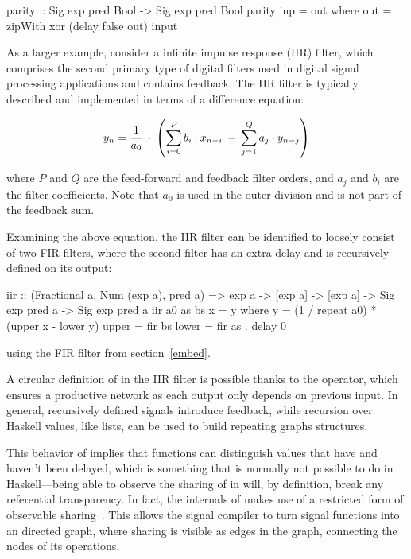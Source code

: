 \documentclass[../paper.tex]{subfiles}
\begin{document}
\begin{code}
parity :: Sig exp pred Bool -> Sig exp pred Bool
parity inp = out where out = zipWith xor (delay false out) input
\end{code}

As a larger example, consider a infinite impulse response (IIR) filter, which comprises the second primary type of digital filters used in digital signal processing applications and contains feedback. The IIR filter is typically described and implemented in terms of a difference equation:

\begin{equation}
y_{n} = {1 \over a_{0}} \: \cdot \: \left( \sum_{i=0}^{P} b_{i} \cdot x_{n-i} \: - \: \sum_{j=1}^{Q} a_{j} \cdot y_{n-j} \right)
\end{equation}
\vspace{1mm}

\noindent where $P$ and $Q$ are the feed-forward and feedback filter orders, and $a_{j}$ and $b_{i}$ are the filter coefficients. Note that $a_{0}$ is used in the outer division and is not part of the feedback sum.

Examining the above equation, the IIR filter can be identified to loosely consist of two FIR filters, where the second filter has an extra delay and is recursively defined on its output:


\begin{code}
iir :: (Fractional a, Num (exp a), pred a) => exp a -> [exp a] -> [exp a] ->
  Sig exp pred a -> Sig exp pred a
iir a0 as bs x = y
  where
    y = (1 / repeat a0) * (upper x - lower y)
    upper = fir bs
    lower = fir as . delay 0
\end{code}

\noindent using the FIR filter from section~\ref{embed}.

A circular definition of  in the IIR filter is possible thanks to the  operator, which ensures a productive network as each output only depends on previous input. In general, recursively defined signals introduce feedback, while recursion over Haskell values, like lists, can be used to build repeating graphs structures.

This behavior of  implies that functions can distinguish values that have and haven't been delayed, which is something that is normally not possible to do in Haskell---being able to observe the sharing of  in  will, by definition, break any referential transparency. In fact, the internals of  makes use of a restricted form of observable sharing~\cite{claessen1999, gill2009}. This allows the signal compiler to turn signal functions into an directed graph, where sharing is visible as edges in the graph, connecting the nodes of its operations.
\end{document}
